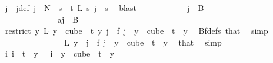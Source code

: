 \begin{isabellebody}
\ j\ \ j{\isacharunderscore}{\kern0pt}def{\isacharcolon}{\kern0pt}\ {\isachardoublequoteopen}j\ {\isacharless}{\kern0pt}\ N{\isacharprime}{\kern0pt}\ {\isasymand}\ {\isacharparenleft}{\kern0pt}{\isasymforall}s\ {\isacharless}{\kern0pt}\ t{\isachardot}{\kern0pt}\ L{\isacharprime}{\kern0pt}\ s\ j\ {\isacharequal}{\kern0pt}\ s{\isacharparenright}{\kern0pt}{\isachardoublequoteclose}\ \isamarkupfalse%
\ blast\isanewline
\ \ \ \ \ \ \ \ \ \ \isamarkupfalse%
\ {\isachardoublequoteopen}j\ {\isasymnotin}\ B\ {}{\isachardoublequoteclose}\isanewline
\ \ \ \ \ \ \ \ \ \ \isamarkupfalse%
\ \isanewline
\ \ \ \ \ \ \ \ \ \ \ \ \isamarkupfalse%
\ a{\isacharcolon}{\kern0pt}{\isachardoublequoteopen}j\ {\isasymin}\ B\ {}{\isachardoublequoteclose}\isanewline
\ \ \ \ \ \ \ \ \ \ \ \ \isamarkupfalse%
\ \isamarkupfalse%
\ {\isachardoublequoteopen}{\isacharparenleft}{\kern0pt}restrict\ {\isacharparenleft}{\kern0pt}{\isasymlambda}y{\isachardot}{\kern0pt}\ L\ {\isacharparenleft}{\kern0pt}y\ {}{\isacharparenright}{\kern0pt}{\isacharparenright}{\kern0pt}\ {\isacharparenleft}{\kern0pt}cube\ {}\ t{\isacharparenright}{\kern0pt}{\isacharparenright}{\kern0pt}\ y\ j\ {\isacharequal}{\kern0pt}\ f\ j{\isachardoublequoteclose}\ \ {\isachardoublequoteopen}y\ {\isasymin}\ cube\ {}\ t{\isachardoublequoteclose}\ \ y\ \isamarkupfalse%
\ Bf{\isacharunderscore}{\kern0pt}defs\ that\ \isamarkupfalse%
\ simp\isanewline
\ \ \ \ \ \ \ \ \ \ \ \ \isamarkupfalse%
\ \isamarkupfalse%
\ {\isachardoublequoteopen}L\ {\isacharparenleft}{\kern0pt}y\ {}{\isacharparenright}{\kern0pt}\ j\ {\isacharequal}{\kern0pt}\ f\ j{\isachardoublequoteclose}\ \ {\isachardoublequoteopen}y\ {\isasymin}\ cube\ {}\ t{\isachardoublequoteclose}\ \ y\ \isamarkupfalse%
\ that\ \isamarkupfalse%
\ simp\isanewline
\ \ \ \ \ \ \ \ \ \ \ \ \isamarkupfalse%
\ \isamarkupfalse%
\ {\isachardoublequoteopen}{\isasymexists}{\isacharbang}{\kern0pt}i{\isachardot}{\kern0pt}\ i\ {\isacharless}{\kern0pt}\ t\ {\isasymand}\ y\ {}\ {\isacharequal}{\kern0pt}\ i{\isachardoublequoteclose}\ \ {\isachardoublequoteopen}y\ {\isasymin}\ cube\ {}\ t{\isachardoublequoteclose}\ \ y\ \isamarkupfalse%

\end{isabellebody}

